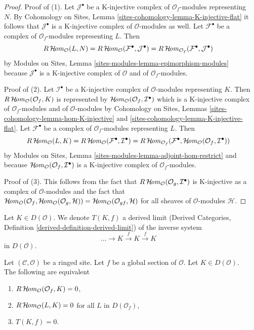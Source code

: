\begin{proof}
Proof of (1). Let $\mathcal{J}^\bullet$ be a K-injective complex of
$\mathcal{O}_f$-modules representing $N$. By Cohomology on Sites, Lemma
\ref{sites-cohomology-lemma-K-injective-flat} it follows that
$\mathcal{J}^\bullet$ is a K-injective complex of
$\mathcal{O}$-modules as well. Let $\mathcal{F}^\bullet$ be a complex of
$\mathcal{O}_f$-modules representing $L$. Then
$$
R\mathop{\mathcal{H}\!\mathit{om}}\nolimits_\mathcal{O}(L, N) =
R\mathop{\mathcal{H}\!\mathit{om}}\nolimits_\mathcal{O}(\mathcal{F}^\bullet, \mathcal{J}^\bullet) =
R\mathop{\mathcal{H}\!\mathit{om}}\nolimits_{\mathcal{O}_f}(\mathcal{F}^\bullet, \mathcal{J}^\bullet)
$$
by
Modules on Sites, Lemma \ref{sites-modules-lemma-epimorphism-modules}
because $\mathcal{J}^\bullet$ is a K-injective complex of $\mathcal{O}$
and of $\mathcal{O}_f$-modules.

\medskip\noindent
Proof of (2). Let $\mathcal{I}^\bullet$ be a K-injective complex of
$\mathcal{O}$-modules representing $K$.
Then $R\mathop{\mathcal{H}\!\mathit{om}}\nolimits_\mathcal{O}(\mathcal{O}_f, K)$ is represented by
$\mathop{\mathcal{H}\!\mathit{om}}\nolimits_\mathcal{O}(\mathcal{O}_f, \mathcal{I}^\bullet)$ which is
a K-injective complex of $\mathcal{O}_f$-modules and of
$\mathcal{O}$-modules by
Cohomology on Sites, Lemmas \ref{sites-cohomology-lemma-hom-K-injective} and
\ref{sites-cohomology-lemma-K-injective-flat}.
Let $\mathcal{F}^\bullet$ be a complex of $\mathcal{O}_f$-modules
representing $L$. Then
$$
R\mathop{\mathcal{H}\!\mathit{om}}\nolimits_\mathcal{O}(L, K) =
R\mathop{\mathcal{H}\!\mathit{om}}\nolimits_\mathcal{O}(\mathcal{F}^\bullet, \mathcal{I}^\bullet) =
R\mathop{\mathcal{H}\!\mathit{om}}\nolimits_{\mathcal{O}_f}(\mathcal{F}^\bullet,
\mathop{\mathcal{H}\!\mathit{om}}\nolimits_\mathcal{O}(\mathcal{O}_f, \mathcal{I}^\bullet))
$$
by Modules on Sites, Lemma \ref{sites-modules-lemma-adjoint-hom-restrict}
and because $\mathop{\mathcal{H}\!\mathit{om}}\nolimits_\mathcal{O}(\mathcal{O}_f, \mathcal{I}^\bullet)$ is a
K-injective complex of $\mathcal{O}_f$-modules.

\medskip\noindent
Proof of (3). This follows from the fact that
$R\mathop{\mathcal{H}\!\mathit{om}}\nolimits_\mathcal{O}(\mathcal{O}_g, \mathcal{I}^\bullet)$
is K-injective as a complex of $\mathcal{O}$-modules and the fact that
$\mathop{\mathcal{H}\!\mathit{om}}\nolimits_\mathcal{O}(\mathcal{O}_f,
\mathop{\mathcal{H}\!\mathit{om}}\nolimits_\mathcal{O}(\mathcal{O}_g, \mathcal{H})) = 
\mathop{\mathcal{H}\!\mathit{om}}\nolimits_\mathcal{O}(\mathcal{O}_{gf}, \mathcal{H})$
for all sheaves of $\mathcal{O}$-modules $\mathcal{H}$.
\end{proof}

\noindent
Let $K \in D(\mathcal{O})$. We denote
$T(K, f)$ a derived limit (Derived Categories, Definition
\ref{derived-definition-derived-limit}) of the inverse system
$$
\ldots \to K \xrightarrow{f} K \xrightarrow{f} K
$$
in $D(\mathcal{O})$.

\begin{lemma}
\label{lemma-hom-from-Af}
Let $(\mathcal{C}, \mathcal{O})$ be a ringed site. Let $f$ be a global
section of $\mathcal{O}$. Let $K \in D(\mathcal{O})$.
The following are equivalent
\begin{enumerate}
\item $R\mathop{\mathcal{H}\!\mathit{om}}\nolimits_\mathcal{O}(\mathcal{O}_f, K) = 0$,
\item $R\mathop{\mathcal{H}\!\mathit{om}}\nolimits_\mathcal{O}(L, K) = 0$ for all $L$ in $D(\mathcal{O}_f)$,
\item $T(K, f) = 0$.
\end{enumerate}
\end{lemma}

